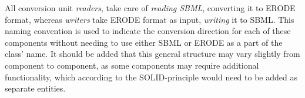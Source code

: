 All conversion unit \emph{readers}, take care of \emph{reading SBML}, converting it to ERODE format, whereas \emph{writers} take ERODE format as input, \emph{writing} it to SBML. This naming convention is used to indicate the conversion direction for each of these components without needing to use either SBML or ERODE as a part of the class' name.
It should be added that this general structure may vary slightly from component to component, as some components may require additional functionality, which according to the SOLID-principle would need to be added as separate entities.
